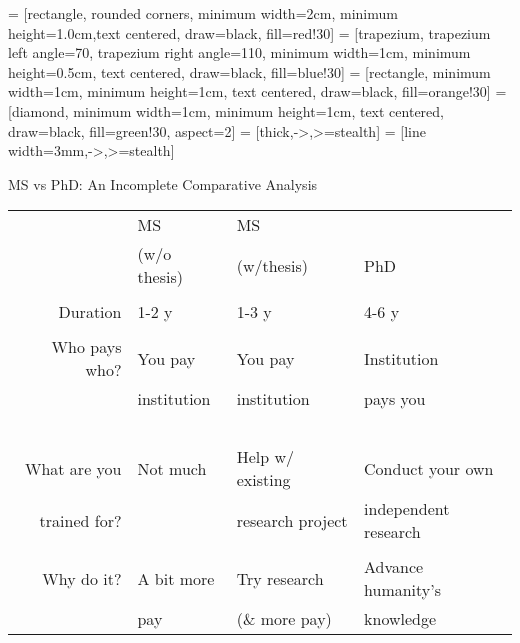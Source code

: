  = [rectangle, rounded corners, minimum width=2cm, minimum height=1.0cm,text centered, draw=black, fill=red!30]
 = [trapezium, trapezium left angle=70, trapezium right angle=110, minimum width=1cm, minimum height=0.5cm, text centered, draw=black, fill=blue!30]
 = [rectangle, minimum width=1cm, minimum height=1cm, text centered, draw=black, fill=orange!30]
 = [diamond, minimum width=1cm, minimum height=1cm, text centered, draw=black, fill=green!30, aspect=2]
 = [thick,->,>=stealth]
 = [line width=3mm,->,>=stealth]

\begin{frame}[fragile]{MS vs PhD: An Incomplete Comparative Analysis}
    \begin{center}
        \begin{tabular}{r|l|l|l}
            & \textcolor{blue!60!black}{MS}& \textcolor{yellow!40!black}{MS} & \\
            & \textcolor{blue!60!black}{(w/o thesis)}& \textcolor{yellow!40!black}{(w/thesis)} & \textcolor{green!60!black}{PhD}\\\hline
            &&&\\
            Duration & 1-2 y & 1-3 y & 4-6 y\\
            &&&\\
            Who pays who? & You pay & You pay & Institution\\\
            & institution & institution & pays you\\\
            &&&\\
             What are you & Not much & Help w/ existing & Conduct your own\\
             trained for? & & research project & independent research\\
             &&&\\
            Why do it? & A bit more & Try research & Advance humanity's\\
            & pay & (\& more pay) & knowledge \\
        \end{tabular}
    \end{center}
\end{frame}
